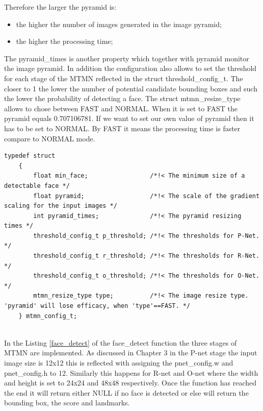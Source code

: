 Therefore the larger the {\selectfont pyramid} is: 
\begin{itemize}
    \item the higher the number of images generated in the image pyramid;
    \item the higher the processing time;
\end{itemize}

The {\selectfont pyramid\_times} is another property which together with {\selectfont pyramid} monitor the image pyramid. In addition the configuration also allows to set the threshold for each stage of the MTMN reflected in the struct {\selectfont threshold\_config\_t}. The closer to 1 the lower the number of potential candidate bounding boxes and such the lower the probability of detecting a face. 
The struct {\selectfont mtmn\_resize\_type} allows to chose between FAST and NORMAL. When it is set to FAST the {\selectfont pyramid} equals 0.707106781. If we want to set our own value of {\selectfont pyramid} then it has to be set to NORMAL. By FAST it means the processing time is faster compare to NORMAL mode. 


\begin{lstlisting}[caption={MTMN configurations \cite{espwho}. },label=mtmn, captionpos=b]
 typedef struct
    {
        float min_face;                 /*!< The minimum size of a detectable face */
        float pyramid;                  /*!< The scale of the gradient scaling for the input images */
        int pyramid_times;              /*!< The pyramid resizing times */
        threshold_config_t p_threshold; /*!< The thresholds for P-Net.  */
        threshold_config_t r_threshold; /*!< The thresholds for R-Net. */
        threshold_config_t o_threshold; /*!< The thresholds for O-Net.  */
        mtmn_resize_type type;          /*!< The image resize type. 'pyramid' will lose efficacy, when 'type'==FAST. */
    } mtmn_config_t;
    
\end{lstlisting}

In the Listing \ref{face_detect}  of the {\selectfont face\_detect} function the three stages of MTMN are implemented. As discussed in Chapter 3 in the P-net stage the input image size is 12x12 this is reflected with assigning the {\selectfont pnet\_config.w} and {\selectfont pnet\_config.h} to 12. Similarly this happens for R-net and O-net where the width and height is set to 24x24 and 48x48 respectively. Once the function has reached the end it will return either NULL if no face is detected or else will return the bounding box, the score and landmarks.



